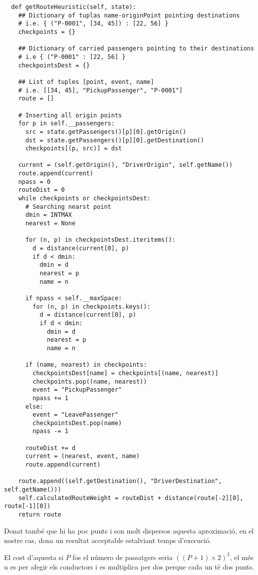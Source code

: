 \begin{verbatim}
  def getRouteHeuristic(self, state):
    ## Dictionary of tuplas name-originPoint pointing destinations
    # i.e. { ("P-0001", [34, 45]) : [22, 56] }
    checkpoints = {}

    ## Dictionary of carried passengers pointing to their destinations
    # i.e { ("P-0001" : [22, 56] }
    checkpointsDest = {}

    ## List of tuples [point, event, name]
    # i.e. [[34, 45], "PickupPassenger", "P-0001"]
    route = []

    # Inserting all origin points
    for p in self.__passengers:
      src = state.getPassengers()[p][0].getOrigin()
      dst = state.getPassengers()[p][0].getDestination()
      checkpoints[(p, src)] = dst

    current = (self.getOrigin(), "DriverOrigin", self.getName())
    route.append(current)
    npass = 0
    routeDist = 0
    while checkpoints or checkpointsDest:
      # Searching nearst point
      dmin = INTMAX
      nearest = None

      for (n, p) in checkpointsDest.iteritems():
        d = distance(current[0], p)
        if d < dmin:
          dmin = d
          nearest = p
          name = n

      if npass < self.__maxSpace:
        for (n, p) in checkpoints.keys():
          d = distance(current[0], p)
          if d < dmin:
            dmin = d
            nearest = p
            name = n

      if (name, nearest) in checkpoints:
        checkpointsDest[name] = checkpoints[(name, nearest)]
        checkpoints.pop((name, nearest))
        event = "PickupPassenger"
        npass += 1
      else:
        event = "LeavePassenger"
        checkpointsDest.pop(name)
        npass -= 1
        
      routeDist += d
      current = (nearest, event, name)
      route.append(current)
    
    route.append((self.getDestination(), "DriverDestination", self.getName()))
    self.calculatedRouteWeight = routeDist + distance(route[-2][0], route[-1][0])
    return route
\end{verbatim}

Donat també que hi ha poc punts i son molt dispersos aquesta aproximació, en el nostre cas,
dona un resultat acceptable estalviant temps d'execució.

El cost d'aquesta si $P$ fos el número de passatgers seria $((P+1) \times 2)^2$, el més u
es per afegir els conductors i es multiplica per dos perque cada un té dos punts.

